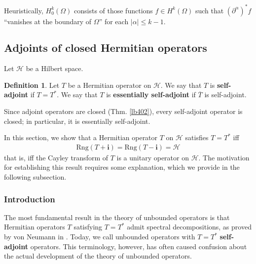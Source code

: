 \documentclass[12pt,b5paper,notitlepage]{article}
\theoremstyle{definition}
\newtheorem{df}{Definition}[subsection]
\theoremstyle{plain}
\newcommand{\ovl}{\overline}
\newcommand{\im}{\mathbf{i}}
\newcommand{\Rng}{\mathrm{Rng}}
\newcommand{\MH}{\mathcal H}
\numberwithin{equation}{section}
\begin{document}
Heuristically, $H^k_0(\Omega)$ consists of those functions $f\in H^k(\Omega)$ such that $(\partial^\alpha)^*f$ ``vanishes at the boundary of $\Omega$'' for each $|\alpha|\leq k-1$. 


\subsection{Adjoints of closed Hermitian operators}\label{lb408}


Let $\MH$ be a Hilbert space. 
\begin{df}
Let $T$ be a Hermitian operator on $\MH$. We say that $T$ is \textbf{self-adjoint} if $T=T^*$.  We say that $T$ is \textbf{essentially self-adjoint}  if $\ovl T$ is self-adjoint.
\end{df}

Since adjoint operators are closed (Thm. \ref{lb402}), every self-adjoint operator is closed; in particular, it is essentially self-adjoint.

In this section, we show that a Hermitian operator $T$ on $\MH$ satisfies $T=T^*$ iff \begin{align}\label{eq209}
\Rng(T+\im)=\Rng(T-\im)=\MH
\end{align}
that is, iff the Cayley transform of $T$ is a unitary operator on $\MH$. The motivation for establishing this result requires some explanation, which we provide in the following subsection.




\subsubsection{Introduction}\label{lb411}



The most fundamental result in the theory of unbounded operators is that Hermitian operators $T$ satisfying $T=T^*$ admit spectral decompositions, as proved by von Neumann in \cite{vN29a}. Today, we call unbounded operators with $T=T^*$ \textbf{self-adjoint} operators. This terminology, however, has often caused confusion about the actual development of the theory of unbounded operators.
\end{document}
